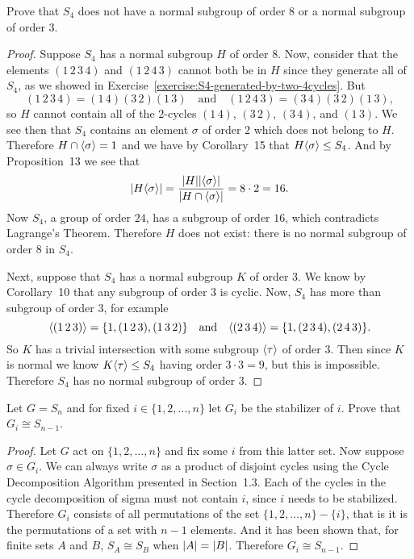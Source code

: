  Prove that $S_4$ does not have a normal subgroup of
order $8$ or a normal subgroup of order $3$.
\begin{proof}
  Suppose $S_4$ has a normal subgroup $H$ of order $8$. Now, consider
  that the elements $(1\,2\,3\,4)$ and $(1\,2\,4\,3)$ cannot both be
  in $H$ since they generate all of $S_4$, as we showed in
  Exercise~\ref{exercise:S4-generated-by-two-4cycles}. But
  \begin{equation*}
    (1\,2\,3\,4) = (1\,4)(3\,2)(1\,3)
    \quad\text{and}\quad
    (1\,2\,4\,3) = (3\,4)(3\,2)(1\,3),
  \end{equation*}
  so $H$ cannot contain all of the $2$-cycles $(1\,4)$, $(3\,2)$,
  $(3\,4)$, and $(1\,3)$. We see then that $S_4$ contains an element
  $\sigma$ of order $2$ which does not belong to $H$. Therefore
  $H\cap\langle{\sigma}\rangle = 1$ and we have by Corollary~15 that
  $H\langle{\sigma}\rangle\leq S_4$. And by Proposition~13 we see that
  \begin{equation*}
    \lvert{H\langle{\sigma}\rangle}\rvert
    = \frac{\lvert{H}\rvert\lvert{\langle{\sigma}\rangle}\rvert}{\lvert{H\cap\langle{\sigma}\rangle}\rvert}
    = 8\cdot2 = 16.
  \end{equation*}
  Now $S_4$, a group of order $24$, has a subgroup of order $16$,
  which contradicts Lagrange's Theorem. Therefore $H$ does not exist:
  there is no normal subgroup of order $8$ in $S_4$.

  Next, suppose that $S_4$ has a normal subgroup $K$ of order $3$. We
  know by Corollary~10 that any subgroup of order $3$ is cyclic. Now,
  $S_4$ has more than subgroup of order $3$, for example
  \begin{equation*}
    \langle{(1\,2\,3)}\rangle = \{1, (1\,2\,3), (1\,3\,2)\}
    \quad\text{and}\quad
    \langle{(2\,3\,4)}\rangle = \{1, (2\,3\,4), (2\,4\,3)\}.
  \end{equation*}
  So $K$ has a trivial intersection with some subgroup $\langle{\tau}\rangle$ of
  order $3$. Then since $K$ is normal we know $K\langle{\tau}\rangle\leq S_4$
  having order $3\cdot3 = 9$, but this is impossible. Therefore $S_4$
  has no normal subgroup of order $3$.
\end{proof}

 Let $G = S_n$ and for fixed $i\in\{1,2,\dots,n\}$ let
$G_i$ be the stabilizer of $i$. Prove that $G_i\cong S_{n-1}$.
\begin{proof}
  Let $G$ act on $\{1,2,\dots,n\}$ and fix some $i$ from this latter
  set. Now suppose $\sigma\in G_i$. We can always write $\sigma$ as a
  product of disjoint cycles using the Cycle Decomposition Algorithm
  presented in Section~1.3. Each of the cycles in the cycle
  decomposition of sigma must not contain $i$, since $i$ needs to be
  stabilized. Therefore $G_i$ consists of all permutations of the set
  $\{1,2,\dots,n\} - \{i\}$, that is it is the permutations of a set
  with $n-1$ elements. And it has been shown that, for finite sets $A$
  and $B$, $S_A\cong S_B$ when $\lvert{A}\rvert = \lvert{B}\rvert$. Therefore
  $G_i\cong S_{n-1}$.
\end{proof}
